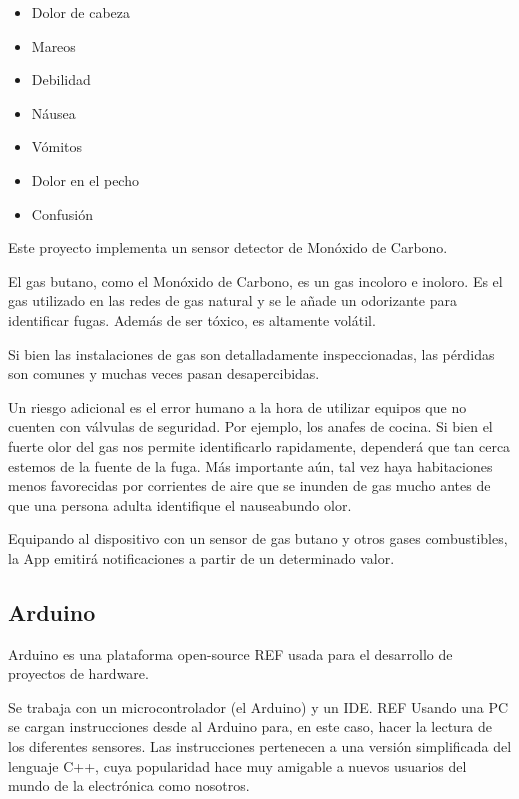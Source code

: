 \documentclass{IEEEtran}
\begin{document}
			\begin{itemize}
				\item Dolor de cabeza
				\item Mareos
				\item Debilidad
				\item Náusea
				\item Vómitos
				\item Dolor en el pecho
				\item Confusión
			\end{itemize}

			Este proyecto implementa un sensor detector de Monóxido de Carbono.

			El gas butano, como el Monóxido de Carbono, es un gas incoloro e inoloro. Es el gas utilizado en las redes de gas natural y se le añade un odorizante para identificar fugas. Además de ser tóxico, es altamente volátil.

			Si bien las instalaciones de gas son detalladamente inspeccionadas, las pérdidas son comunes y muchas veces pasan desapercibidas.

			Un riesgo adicional es el error humano a la hora de utilizar equipos que no cuenten con válvulas de seguridad. Por ejemplo, los anafes de cocina. Si bien el fuerte olor del gas nos permite identificarlo rapidamente, dependerá que tan cerca estemos de la fuente de la fuga. Más importante aún, tal vez haya habitaciones menos favorecidas por corrientes de aire que se inunden de gas mucho antes de que una persona adulta identifique el nauseabundo olor.

			Equipando al dispositivo con un sensor de gas butano y otros gases combustibles, la App emitirá notificaciones a partir de un determinado valor.

		\subsection{Arduino}

			Arduino es una plataforma open-source REF usada para el desarrollo de proyectos de hardware.

			Se trabaja con un microcontrolador (el Arduino) y un IDE. REF Usando una PC se cargan instrucciones desde al Arduino para, en este caso, hacer la lectura de los diferentes sensores. Las instrucciones pertenecen a una versión simplificada del lenguaje C++, cuya popularidad hace muy amigable a nuevos usuarios del mundo de la electrónica como nosotros.
\end{document}
